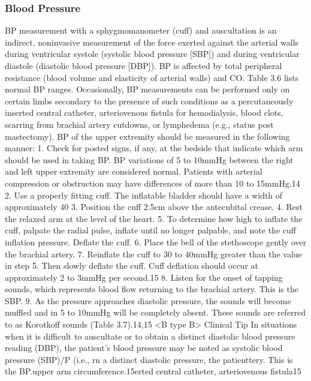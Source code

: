 \subsubsection{Blood Pressure}
BP measurement with a sphygmomanometer (cuff) and auscultation is an indirect, noninvasive measurement of the force exerted against the arterial walls during ventricular systole (systolic blood pressure [SBP]) and during ventricular diastole (diastolic blood pressure [DBP]). BP is affected by total peripheral resistance (blood volume and elasticity of arterial walls) and CO. Table 3.6 lists normal BP ranges. Occasionally, BP measurements can be performed only on certain limbs secondary to the presence of such conditions as a percutaneously inserted central catheter, arteriovenous fistula for hemodialysis, blood clots, scarring from brachial artery cutdowns, or lymphedema (e.g., status post mastectomy). BP of the upper extremity should be measured in the following manner:
1. Check for posted signs, if any, at the bedside that indicate which arm should be used in taking BP. BP variations of 5 to 10mmHg between the right and left upper extremity are considered normal. Patients with arterial compression or obstruction may have differences of more than 10 to 15mmHg.14
2. Use a properly fitting cuff. The inflatable bladder should have a width of approximately 40%
3. Position the cuff 2.5cm above the antecubital crease.
4. Rest the relaxed arm at the level of the heart.
5. To determine how high to inflate the cuff, palpate the radial pulse, inflate until no longer palpable, and note the cuff inflation pressure. Deflate the cuff.
6. Place the bell of the stethoscope gently over the brachial artery.
7. Reinflate the cuff to 30 to 40mmHg greater than the value in step 5. Then slowly deflate the cuff. Cuff deflation should occur at approximately 2 to 3mmHg per second.15
8. Listen for the onset of tapping sounds, which represents blood flow returning to the brachial artery. This is the SBP.
9. As the pressure approaches diastolic pressure, the sounds will become muffled and in 5 to 10mmHg will be completely absent. These sounds are referred to as Korotkoff sounds (Table 3.7).14,15
<B type B>
Clinical Tip
In situations when it is difficult to auscultate or to obtain a distinct diastolic blood pressure reading (DBP), the patient’s blood pressure may be noted as systolic blood pressure (SBP)/P (i.e., rn a distinct diastolic pressure, the patienttery. This is the BP.upper arm circumference.15erted central catheter, arteriovenous fistula15
